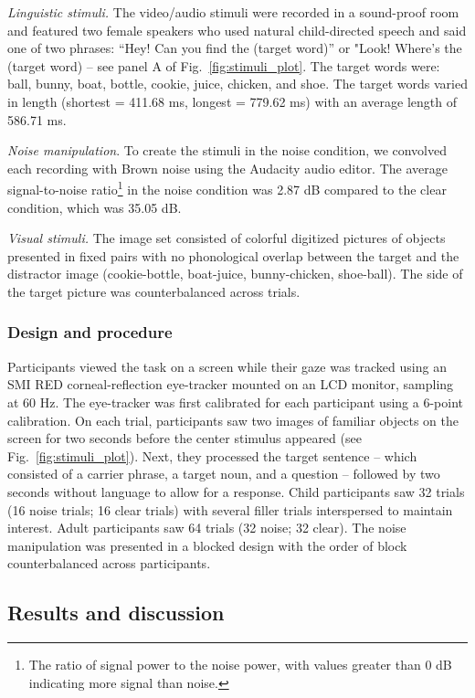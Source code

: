 \documentclass[english,floatsintext,man]{apa6}
\begin{document}
\emph{Linguistic stimuli.} The video/audio stimuli were recorded in a
sound-proof room and featured two female speakers who used natural
child-directed speech and said one of two phrases: \enquote{Hey! Can you
find the (target word)} or "Look! Where's the (target word) -- see panel
A of Fig.~\ref{fig:stimuli_plot}. The target words were: ball, bunny,
boat, bottle, cookie, juice, chicken, and shoe. The target words varied
in length (shortest = 411.68 ms, longest = 779.62 ms) with an average
length of 586.71 ms.

\emph{Noise manipulation}. To create the stimuli in the noise condition,
we convolved each recording with Brown noise using the Audacity audio
editor. The average signal-to-noise ratio\footnote{The ratio of signal
  power to the noise power, with values greater than 0 dB indicating
  more signal than noise.} in the noise condition was 2.87 dB compared
to the clear condition, which was 35.05 dB.

\emph{Visual stimuli.} The image set consisted of colorful digitized
pictures of objects presented in fixed pairs with no phonological
overlap between the target and the distractor image (cookie-bottle,
boat-juice, bunny-chicken, shoe-ball). The side of the target picture
was counterbalanced across trials.

\hypertarget{design-and-procedure-2}{%
\subsubsection{Design and procedure}\label{design-and-procedure-2}}

Participants viewed the task on a screen while their gaze was tracked
using an SMI RED corneal-reflection eye-tracker mounted on an LCD
monitor, sampling at 60 Hz. The eye-tracker was first calibrated for
each participant using a 6-point calibration. On each trial,
participants saw two images of familiar objects on the screen for two
seconds before the center stimulus appeared (see
Fig.~\ref{fig:stimuli_plot}). Next, they processed the target sentence
-- which consisted of a carrier phrase, a target noun, and a question --
followed by two seconds without language to allow for a response. Child
participants saw 32 trials (16 noise trials; 16 clear trials) with
several filler trials interspersed to maintain interest. Adult
participants saw 64 trials (32 noise; 32 clear). The noise manipulation
was presented in a blocked design with the order of block
counterbalanced across participants.

\hypertarget{results-and-discussion-2}{%
\subsection{Results and discussion}\label{results-and-discussion-2}}
\end{document}
